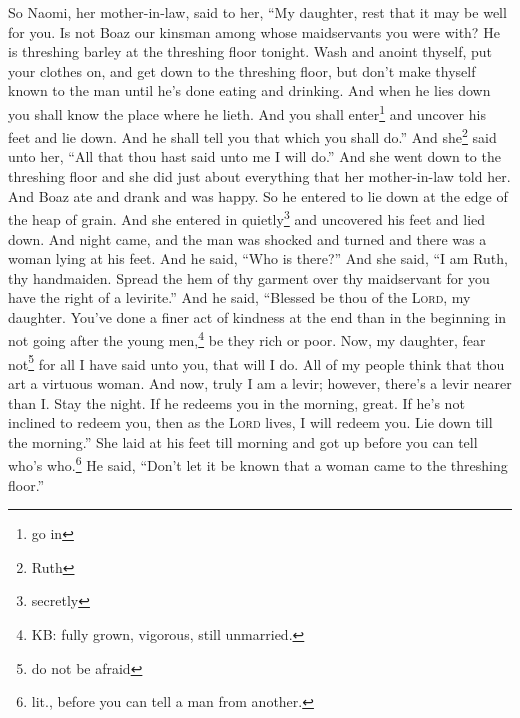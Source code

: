
\begin{inparaenum}
     So Naomi, her mother-in-law, said to her, ``My daughter, rest that it may be well for you.%
     Is not Boaz our kinsman among whose maidservants you were with? He is threshing barley at the threshing floor tonight.%
     Wash and anoint thyself, put your clothes on, and get down to the threshing floor, but don't make thyself known to the man until he's done eating and drinking.%
     And when he lies down you shall know the place where he lieth. And you shall enter\footnote{go in} and uncover his feet and lie down. And he shall tell you that which you shall do.''%
     And she\footnote{Ruth} said unto her, ``All that thou hast said unto me I will do.''%
     And she went down to the threshing floor and she did just about everything that her mother-in-law told her.%
     And Boaz ate and drank and was happy. So he entered to lie down at the edge of the heap of grain. And she entered in quietly\footnote{secretly} and uncovered his feet and lied down.%
     And night came, and the man was shocked and turned and there was a woman lying at his feet.%
     And he said, ``Who is there?'' And she said, ``I am Ruth, thy handmaiden. Spread the hem of thy garment over thy maidservant for you have the right of a levirite.''%
     And he said, ``Blessed be thou of the \textsc{Lord}, my daughter. You've done a finer act of kindness at the end than in the beginning in not going after the young men,\footnote{KB: fully grown, vigorous, still unmarried.} be they rich or poor.%
     Now, my daughter, fear not\footnote{do not be afraid} for all I have said unto you, that will I do. All of my people think that thou art a virtuous woman.%
     And now, truly I am a levir; however, there's a levir nearer than I.%
     Stay the night. If he redeems you in the morning, great. If he's not inclined to redeem you, then as the \textsc{Lord} lives, I will redeem you. Lie down till the morning.''%
     She laid at his feet till morning and got up before you can tell who's who.\footnote{lit., before you can tell a man from another.} He said, ``Don't let it be known that a woman came to the threshing floor.''%

\end{inparaenum}
